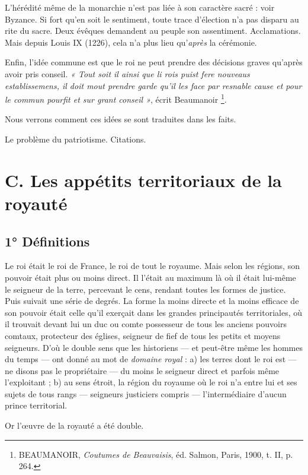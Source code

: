 \documentclass[french,twoside]{book} %
\begin{document}
L’hérédité même de la monarchie n’est pas liée à son caractère sacré : voir Byzance. Si fort qu’en soit le sentiment, toute trace d’élection n’a pas disparu au rite du sacre. Deux évêques demandent au peuple son assentiment. Acclamations. Mais depuis Louis IX (1226), cela n’a plus lieu qu’{\itshape après} la cérémonie.\par
Enfin, l’idée commune est que le roi ne peut prendre des décisions graves qu’après avoir pris conseil. \emph{« Tout soit il ainsi que li rois puist fere nouveaus establissemens, il doit mout prendre garde qu’il les face par resnable cause et pour le commun pourfit et sur grant conseil »}, écrit Beaumanoir \footnote{ BEAUMANOIR, {\itshape Coutumes de Beauvaisis}, éd. Salmon, Paris, 1900, t. II, p. 264.}.\par
Nous verrons comment ces idées se sont traduites dans les faits.\par
Le problème du patriotisme. Citations.
\section[C. Les appétits territoriaux de la royauté]{C. Les appétits territoriaux de la royauté}
\label{c03c}
\subsection[1° Définitions]{1° Définitions}
\label{c03c1}
\noindent Le roi était le roi de France, le roi de tout le royaume. Mais selon les régions, son pouvoir était plus ou moins direct. Il l’était au maximum là où il était lui-même le seigneur de la terre, percevant le cens, rendant toutes les formes de justice. Puis suivait une série de degrés. La forme la moins directe et la moins efficace de son pouvoir était celle qu’il exerçait dans les grandes principautés territoriales, où il trouvait devant lui un duc ou comte possesseur de tous les anciens pouvoirs comtaux, protecteur des églises, seigneur de fief de tous les petits et moyens seigneurs. D’où le double sens que les historiens — et peut-être même les hommes du temps — ont donné au mot de {\itshape domaine royal} : a) les terres dont le roi est — ne disons pas le propriétaire — du moins le seigneur direct et parfois même l’exploitant ; b) au sens étroit, la région du royaume où le roi n’a entre lui et ses sujets de tous rangs — seigneurs justiciers compris — l’intermédiaire d’aucun prince territorial.\par
Or l’œuvre de la royauté a été double.\par
\end{document}

